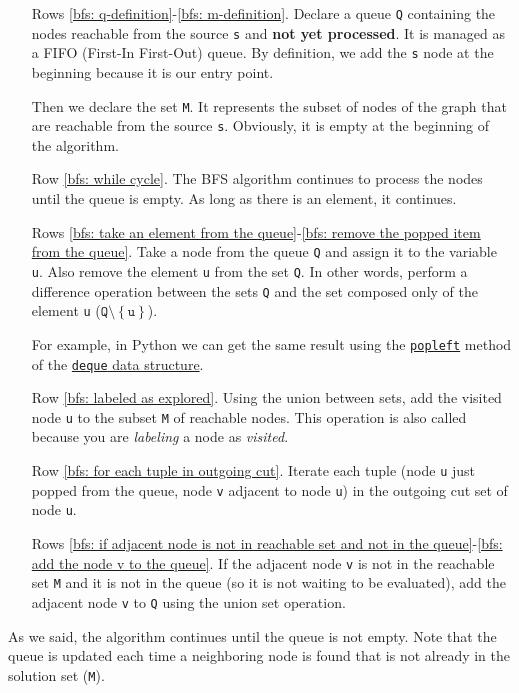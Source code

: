 \begin{itemize}
    \item[Rows \ref{bfs: q-definition}-\ref{bfs: m-definition}.] Declare a queue \texttt{Q} containing the nodes reachable from the source \texttt{s} and \textbf{not yet processed}. It is managed as a FIFO (First-In First-Out) queue. By definition, we add the \texttt{s} node at the beginning because it is our entry point.
    
    Then we declare the set \texttt{M}. It represents the subset of nodes of the graph that are reachable from the source \texttt{s}. Obviously, it is empty at the beginning of the algorithm.

    \item[Row \ref{bfs: while cycle}.] The BFS algorithm continues to process the nodes until the queue is empty. As long as there is an element, it continues.
    
    \item[Rows \ref{bfs: take an element from the queue}-\ref{bfs: remove the popped item from the queue}.] Take a node from the queue \texttt{Q} and assign it to the variable \texttt{u}. Also remove the element \texttt{u} from the set \texttt{Q}. In other words, perform a difference operation between the sets \texttt{Q} and the set composed only of the element \texttt{u} ($\texttt{Q} \setminus \left\{\texttt{u}\right\}$).
    
    For example, in Python we can get the same result using the \href{https://docs.python.org/3/library/collections.html#collections.deque.popleft}{\texttt{popleft}} method of the \href{https://docs.python.org/3/tutorial/datastructures.html#using-lists-as-queues}{\texttt{deque} data structure}.

    \item[Row \ref{bfs: labeled as explored}.] Using the union between sets, add the visited node \texttt{u} to the subset \texttt{M} of reachable nodes. This operation is also called  because you are \emph{labeling} a node as \emph{visited}.
    
    \item[Row \ref{bfs: for each tuple in outgoing cut}.] Iterate each tuple (node \texttt{u} just popped from the queue, node \texttt{v} adjacent to node \texttt{u}) in the outgoing cut set of node \texttt{u}.
    
    \item[Rows \ref{bfs: if adjacent node is not in reachable set and not in the queue}-\ref{bfs: add the node v to the queue}.] If the adjacent node \texttt{v} is not in the reachable set \texttt{M} and it is not in the queue (so it is not waiting to be evaluated), add the adjacent node \texttt{v} to \texttt{Q} using the union set operation.
\end{itemize}
As we said, the algorithm continues until the queue is not empty. Note that the queue is updated each time a neighboring node is found that is not already in the solution set (\texttt{M}).

